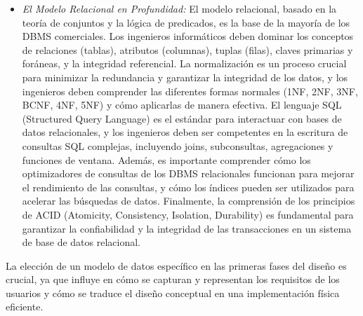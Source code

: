 \begin{itemize}
    \begin{itemize}
    \item \textit{El Modelo Relacional en Profundidad:} El modelo relacional, basado en la teoría de conjuntos y la lógica de predicados, es la base de la mayoría de los DBMS comerciales. Los ingenieros informáticos deben dominar los conceptos de relaciones (tablas), atributos (columnas), tuplas (filas), claves primarias y foráneas, y la integridad referencial.  La normalización es un proceso crucial para minimizar la redundancia y garantizar la integridad de los datos, y los ingenieros deben comprender las diferentes formas normales (1NF, 2NF, 3NF, BCNF, 4NF, 5NF) y cómo aplicarlas de manera efectiva.  El lenguaje SQL (Structured Query Language) es el estándar para interactuar con bases de datos relacionales, y los ingenieros deben ser competentes en la escritura de consultas SQL complejas, incluyendo joins, subconsultas, agregaciones y funciones de ventana.  Además, es importante comprender cómo los optimizadores de consultas de los DBMS relacionales funcionan para mejorar el rendimiento de las consultas, y cómo los índices pueden ser utilizados para acelerar las búsquedas de datos.  Finalmente, la comprensión de los principios de ACID (Atomicity, Consistency, Isolation, Durability) es fundamental para garantizar la confiabilidad y la integridad de las transacciones en un sistema de base de datos relacional.
    \end{itemize}
\end{itemize}

\noindent La elección de un modelo de datos específico en las primeras fases del diseño es crucial, ya que influye en cómo se capturan y representan los requisitos de los usuarios y cómo se traduce el diseño conceptual en una implementación física eficiente.
